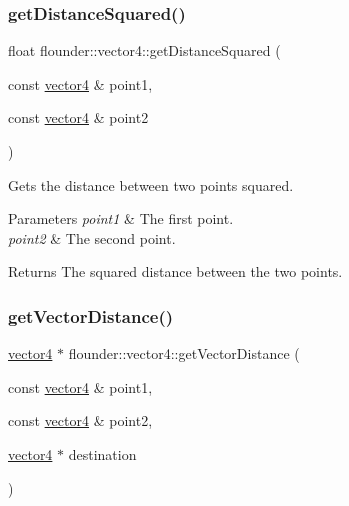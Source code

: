 \subsubsection{\texorpdfstring{get\+Distance\+Squared()}{getDistanceSquared()}}
{\footnotesize\ttfamily float flounder\+::vector4\+::get\+Distance\+Squared (\begin{DoxyParamCaption}\item[{const \hyperlink{classflounder_1_1vector4}{vector4} \&}]{point1,  }\item[{const \hyperlink{classflounder_1_1vector4}{vector4} \&}]{point2 }\end{DoxyParamCaption})\hspace{0.3cm}{\ttfamily [static]}}



Gets the distance between two points squared. 


\begin{DoxyParams}{Parameters}
{\em point1} & The first point. \\
\hline
{\em point2} & The second point. \\
\hline
\end{DoxyParams}
\begin{DoxyReturn}{Returns}
The squared distance between the two points. 
\end{DoxyReturn}
\mbox{\label{classflounder_1_1vector4_a211be3c7da1bdc5a2b71661b291e140d}} 
\subsubsection{\texorpdfstring{get\+Vector\+Distance()}{getVectorDistance()}}
{\footnotesize\ttfamily \hyperlink{classflounder_1_1vector4}{vector4} $\ast$ flounder\+::vector4\+::get\+Vector\+Distance (\begin{DoxyParamCaption}\item[{const \hyperlink{classflounder_1_1vector4}{vector4} \&}]{point1,  }\item[{const \hyperlink{classflounder_1_1vector4}{vector4} \&}]{point2,  }\item[{\hyperlink{classflounder_1_1vector4}{vector4} $\ast$}]{destination }\end{DoxyParamCaption})\hspace{0.3cm}{\ttfamily [static]}}



